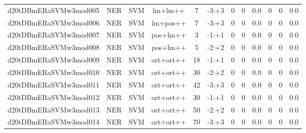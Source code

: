 \documentclass[a4paper]{article}
\begin{document}
\begin{landscape}
\begin{center}
\begin{tabular}{ |c|c|c|c|c|c|c|c|c|c|c|c|}
 
 	
 	\small{ d20tDBmERaSVMw3mod005 } & \small{ NER} & \small{  SVM }  & lm+lm++  &  7 &  \small{  -3:+3 }  &  0 & 0 & 0.0  &  0 & 0 & 0.0 \\
 	

 
 	
 	\small{ d20tDBmERaSVMw3mod006 } & \small{ NER} & \small{  SVM }  & lm+pos++  &  7 &  \small{  -3:+3 }  &  0 & 0 & 0.0  &  0 & 0 & 0.0 \\
 	

 
 	
 	\small{ d20tDBmERaSVMw3mod007 } & \small{ NER} & \small{  SVM }  & pos+lm++  &  3 &  \small{  -1:+1 }  &  0 & 0 & 0.0  &  0 & 0 & 0.0 \\
 	

 
 	
 	\small{ d20tDBmERaSVMw3mod008 } & \small{ NER} & \small{  SVM }  & pos+lm++  &  5 &  \small{  -2:+2 }  &  0 & 0 & 0.0  &  0 & 0 & 0.0 \\
 	

 
 	
 	\small{ d20tDBmERaSVMw3mod009 } & \small{ NER} & \small{  SVM }  & ort+ort++  &  18 &  \small{  -1:+1 }  &  0 & 0 & 0.0  &  0 & 0 & 0.0 \\
 	

 
 	
 	\small{ d20tDBmERaSVMw3mod010 } & \small{ NER} & \small{  SVM }  & ort+ort++  &  30 &  \small{  -2:+2 }  &  0 & 0 & 0.0  &  0 & 0 & 0.0 \\
 	

 
 	
 	\small{ d20tDBmERaSVMw3mod011 } & \small{ NER} & \small{  SVM }  & ort+ort++  &  42 &  \small{  -3:+3 }  &  0 & 0 & 0.0  &  0 & 0 & 0.0 \\
 	

 
 	
 	\small{ d20tDBmERaSVMw3mod012 } & \small{ NER} & \small{  SVM }  & ort+ort++  &  30 &  \small{  -1:+1 }  &  0 & 0 & 0.0  &  0 & 0 & 0.0 \\
 	

 
 	
 	\small{ d20tDBmERaSVMw3mod013 } & \small{ NER} & \small{  SVM }  & ort+ort++  &  50 &  \small{  -2:+2 }  &  0 & 0 & 0.0  &  0 & 0 & 0.0 \\
 	

 
 	
 	\small{ d20tDBmERaSVMw3mod014 } & \small{ NER} & \small{  SVM }  & ort+ort++  &  70 &  \small{  -3:+3 }  &  0 & 0 & 0.0  &  0 & 0 & 0.0 \\
 	


\end{tabular}
\end{center}
\end{landscape}
\end{document}
